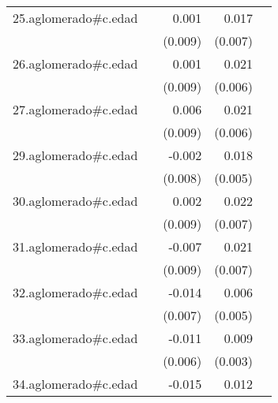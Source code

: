 {\begin{longtable}{l*{4}{D{.}{.}{-1}}}
\addlinespace
25.aglomerado#c.edad&                     &       0.001         &       0.017\sym{**} &                     \\
            &                     &     (0.009)         &     (0.007)         &                     \\
\addlinespace
26.aglomerado#c.edad&                     &       0.001         &       0.021\sym{**} &                     \\
            &                     &     (0.009)         &     (0.006)         &                     \\
\addlinespace
27.aglomerado#c.edad&                     &       0.006         &       0.021\sym{**} &                     \\
            &                     &     (0.009)         &     (0.006)         &                     \\
\addlinespace
29.aglomerado#c.edad&                     &      -0.002         &       0.018\sym{***}&                     \\
            &                     &     (0.008)         &     (0.005)         &                     \\
\addlinespace
30.aglomerado#c.edad&                     &       0.002         &       0.022\sym{**} &                     \\
            &                     &     (0.009)         &     (0.007)         &                     \\
\addlinespace
31.aglomerado#c.edad&                     &      -0.007         &       0.021\sym{**} &                     \\
            &                     &     (0.009)         &     (0.007)         &                     \\
\addlinespace
32.aglomerado#c.edad&                     &      -0.014         &       0.006         &                     \\
            &                     &     (0.007)         &     (0.005)         &                     \\
\addlinespace
33.aglomerado#c.edad&                     &      -0.011         &       0.009\sym{***}&                     \\
            &                     &     (0.006)         &     (0.003)         &                     \\
\addlinespace
34.aglomerado#c.edad&                     &      -0.015         &       0.012         &                     \\

\end{longtable}}
